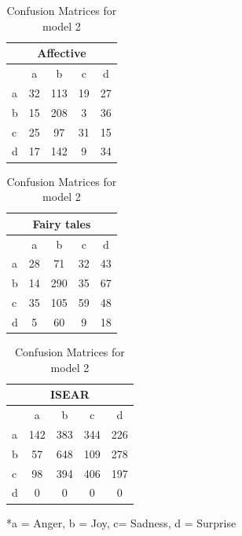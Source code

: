 \documentclass[
10pt, %
a4paper, %
oneside, %
headinclude,footinclude, %
BCOR5mm, %
]{scrartcl}
\begin{document}
\begin{table}[hbt]
            \footnotesize
                \begin{tabular}[t]{|l|c|c|c|c|}
                    \hline
                    \multicolumn{5}{|c|}{{Affective}} \\    
                    \hline
                    &a&b&c&d\\ \hline
                    a&32&113&19&27 \\ \hline
                    b&15&208&3&36\\ \hline
                    c&25&97&31&15 \\ \hline   
                    d&17&142&9&34\\ \hline
                \end{tabular}
                \hfill
                \begin{tabular}[t]{|l|c|c|c|c|}
                    \hline
                    \multicolumn{5}{|c|}{{Fairy tales}} \\    
                    \hline
                    &a&b&c&d\\ \hline
                    a&28&71&32&43 \\ \hline
                    b&14&290&35&67\\ \hline
                    c&35&105&59&48 \\ \hline   
                    d&5&60&9&18\\ \hline
                \end{tabular}
                \hfill
                \begin{tabular}[t]{|l|c|c|c|c|}
                    \hline
                    \multicolumn{5}{|c|}{{ISEAR}} \\    
                    \hline
                    &a&b&c&d\\ \hline
                    a&142&383&344&226 \\ \hline
                    b&57&648&109&278\\ \hline
                    c&98&394&406&197 \\ \hline   
                    d&0&0&0&0\\ \hline
                \end{tabular}
                \caption{Confusion Matrices for model 2}
                \label{Confusion Matrices for model 2}
                *a = Anger, b = Joy, c= Sadness, d = Surprise
            \end{table}
\end{document}
